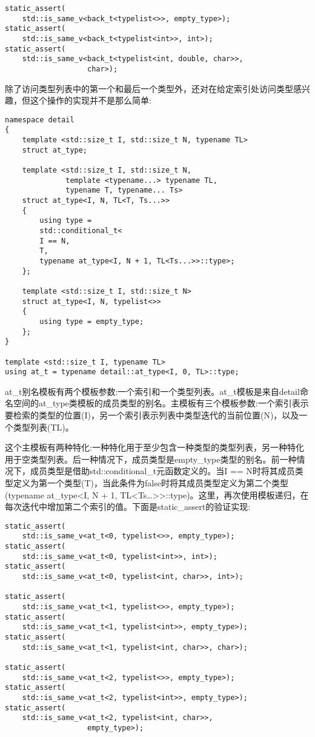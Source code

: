 \begin{lstlisting}[style=styleCXX]
static_assert(
	std::is_same_v<back_t<typelist<>>, empty_type>);
static_assert(
	std::is_same_v<back_t<typelist<int>>, int>);
static_assert(
	std::is_same_v<back_t<typelist<int, double, char>>,
				   char>);
\end{lstlisting}

除了访问类型列表中的第一个和最后一个类型外，还对在给定索引处访问类型感兴趣，但这个操作的实现并不是那么简单:

\begin{lstlisting}[style=styleCXX]
namespace detail
{
	template <std::size_t I, std::size_t N, typename TL>
	struct at_type;
	
	template <std::size_t I, std::size_t N,
			  template <typename...> typename TL,
			  typename T, typename... Ts>
	struct at_type<I, N, TL<T, Ts...>>
	{
		using type =
		std::conditional_t<
		I == N,
		T,
		typename at_type<I, N + 1, TL<Ts...>>::type>;
	};

	template <std::size_t I, std::size_t N>
	struct at_type<I, N, typelist<>>
	{
		using type = empty_type;
	};
}

template <std::size_t I, typename TL>
using at_t = typename detail::at_type<I, 0, TL>::type;
\end{lstlisting}

at\_t别名模板有两个模板参数:一个索引和一个类型列表。at\_t模板是来自detail命名空间的at\_type类模板的成员类型的别名。主模板有三个模板参数:一个索引表示要检索的类型的位置(I)，另一个索引表示列表中类型迭代的当前位置(N)，以及一个类型列表(TL)。

这个主模板有两种特化:一种特化用于至少包含一种类型的类型列表，另一种特化用于空类型列表。后一种情况下，成员类型是empty\_type类型的别名。前一种情况下，成员类型是借助std::conditional\_t元函数定义的。当I == N时将其成员类型定义为第一个类型(T)，当此条件为false时将其成员类型定义为第二个类型(typename at\_type<I, N + 1, TL<Ts…>{}>::type)。这里，再次使用模板递归，在每次迭代中增加第二个索引的值。下面是static\_assert的验证实现:

\begin{lstlisting}[style=styleCXX]
static_assert(
	std::is_same_v<at_t<0, typelist<>>, empty_type>);
static_assert(
	std::is_same_v<at_t<0, typelist<int>>, int>);
static_assert(
	std::is_same_v<at_t<0, typelist<int, char>>, int>);
	
static_assert(
	std::is_same_v<at_t<1, typelist<>>, empty_type>);
static_assert(
	std::is_same_v<at_t<1, typelist<int>>, empty_type>);
static_assert(
	std::is_same_v<at_t<1, typelist<int, char>>, char>);
	
static_assert(
	std::is_same_v<at_t<2, typelist<>>, empty_type>);
static_assert(
	std::is_same_v<at_t<2, typelist<int>>, empty_type>);
static_assert(
	std::is_same_v<at_t<2, typelist<int, char>>,
				   empty_type>);
\end{lstlisting}

